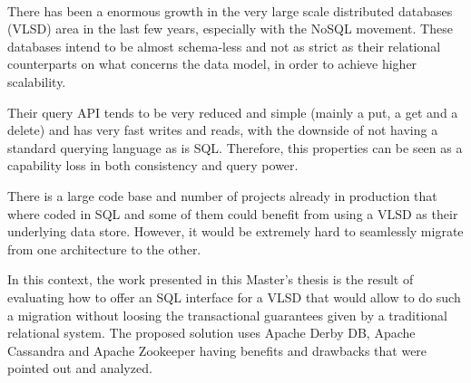 
\paragraph{}

There has been a enormous growth in the very large scale distributed databases (VLSD) area in the last few years, especially with the NoSQL movement. These databases intend to be almost schema-less and not as strict as their relational counterparts on what concerns the data model, in order to achieve higher scalability. 

Their query API tends to be very reduced and simple (mainly a put, a get and a delete) and has very fast writes and reads, with the downside of not having a standard querying language as is SQL. Therefore, this properties can be seen as a capability loss in both consistency and query power. 

There is a large code base and number of projects already in production that where coded in SQL and some of them could benefit from using a VLSD as their underlying data store. However, it would be extremely hard to seamlessly migrate from one architecture to the other.  

In this context, the work presented in this Master's thesis is the result of evaluating how to offer an SQL interface for a VLSD that would allow to do such a migration without loosing the transactional guarantees given by a traditional relational system. The proposed solution uses Apache Derby DB, Apache Cassandra and Apache Zookeeper having benefits and drawbacks that were pointed out and analyzed.

